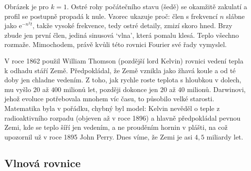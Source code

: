 \begin{center}
\end{center}

Obrázek je pro $k = 1$. Ostré rohy počátečního stavu (šedě) se okamžitě zakulatí a profil se postupně propadá k nule. Vzorec ukazuje proč: člen s frekvencí $n$ slábne jako $\mathrm{e}^{-n^2t}$, takže vysoké frekvence, tedy ostré detaily, zmizí skoro hned. Brzy zbude jen první člen, jediná sinusová `vlna', která pomalu klesá. Teplo všechno rozmaže. Mimochodem, právě kvůli této rovnici Fourier své řady vymyslel.

\begin{note}
  V roce 1862 použil William Thomson (pozdější lord Kelvin) rovnici vedení tepla k odhadu stáří Země. Předpokládal, že Země vznikla jako žhavá koule a od té doby jen chladne vedením. Z toho, jak rychle roste teplota s hloubkou v dolech, mu vyšlo $20$ až $400$ milionů let, později dokonce jen $20$ až $40$ milionů. Darwinovi, jehož evoluce potřebovala mnohem víc času, to působilo velké starosti. Matematika byla v pořádku, chybný byl model: Kelvin nevěděl o teple z radioaktivního rozpadu (objeven až v roce 1896) a hlavně předpokládal pevnou Zemi, kde se teplo šíří jen vedením, a ne prouděním hornin v plášti, na což upozornil už v roce 1895 John Perry. Dnes víme, že Zemi je asi $4{,}5$ miliardy let.
\end{note}

\subsection{Vlnová rovnice}


